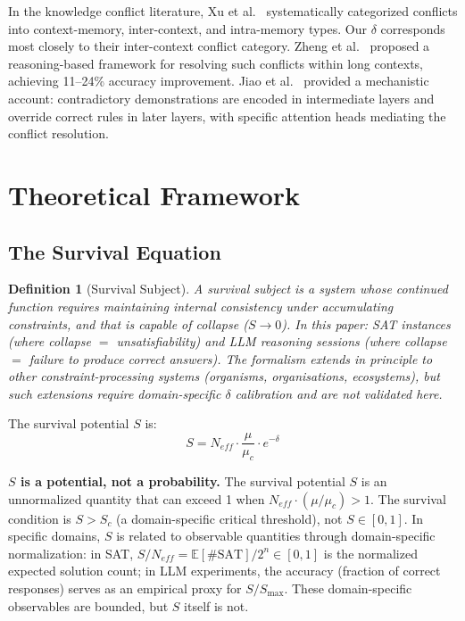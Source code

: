 \documentclass[11pt,a4paper]{article}
\newtheorem{definition}[theorem]{Definition}
\begin{document}
In the knowledge conflict literature, Xu et al.\ \citep{xu2024knowledge} systematically categorized conflicts into context-memory, inter-context, and intra-memory types. Our $\delta$ corresponds most closely to their inter-context conflict category. Zheng et al.\ \citep{zheng2025kcr} proposed a reasoning-based framework for resolving such conflicts within long contexts, achieving 11--24\% accuracy improvement. Jiao et al.\ \citep{jiao2026demonstration} provided a mechanistic account: contradictory demonstrations are encoded in intermediate layers and override correct rules in later layers, with specific attention heads mediating the conflict resolution.

\section{Theoretical Framework}
\label{sec:theory}

\subsection{The Survival Equation}

\begin{definition}[Survival Subject]
A survival subject is a system whose continued function requires maintaining internal consistency under accumulating constraints, and that is capable of collapse ($S \to 0$). In this paper: SAT instances (where collapse $=$ unsatisfiability) and LLM reasoning sessions (where collapse $=$ failure to produce correct answers). The formalism extends in principle to other constraint-processing systems (organisms, organisations, ecosystems), but such extensions require domain-specific $\delta$ calibration and are not validated here.
\end{definition}

The survival potential $S$ is:
\begin{equation}
S = N_{eff} \cdot \frac{\mu}{\mu_c} \cdot e^{-\delta}
\label{eq:survival-main}
\end{equation}

\textbf{$S$ is a potential, not a probability.} The survival potential $S$ is an unnormalized quantity that can exceed 1 when $N_{eff} \cdot (\mu/\mu_c) > 1$. The survival condition is $S > S_c$ (a domain-specific critical threshold), not $S \in [0,1]$. In specific domains, $S$ is related to observable quantities through domain-specific normalization: in SAT, $S/N_{eff} = \mathbb{E}[\#\text{SAT}]/2^n \in [0,1]$ is the normalized expected solution count; in LLM experiments, the accuracy (fraction of correct responses) serves as an empirical proxy for $S/S_{\max}$. These domain-specific observables are bounded, but $S$ itself is not.
\end{document}
